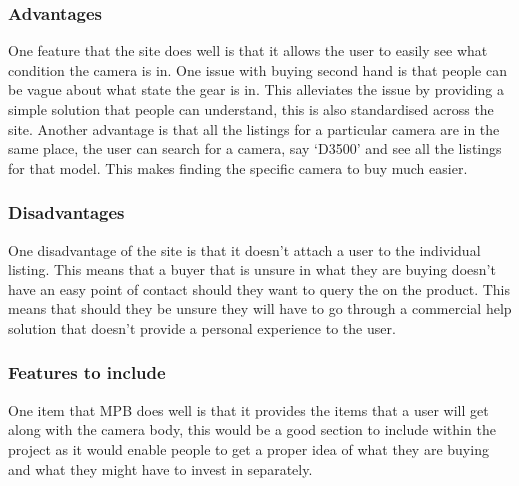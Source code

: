 \subsubsection{Advantages}
One feature that the site does well is that it allows the user to easily see what condition the camera is in. One issue with buying second hand is that people can be vague about what state the gear is in. This alleviates the issue by providing a simple solution that people can understand, this is also standardised across the site. Another advantage is that all the listings for a particular camera are in the same place, the user can search for a camera, say ‘D3500’ and see all the listings for that model. This makes finding the specific camera to buy much easier.
\subsubsection{Disadvantages}
One disadvantage of the site is that it doesn’t attach a user to the individual listing. This means that a buyer that is unsure in what they are buying doesn’t have an easy point of contact should they want to query the on the product. This means that should they be unsure they will have to go through a commercial help solution that doesn’t provide a personal experience to the user.
\subsubsection{Features to include}
One item that MPB does well is that it provides the items that a user will get along with the camera body, this would be a good section to include within the project as it would enable people to get a proper idea of what they are buying and what they might have to invest in separately.

